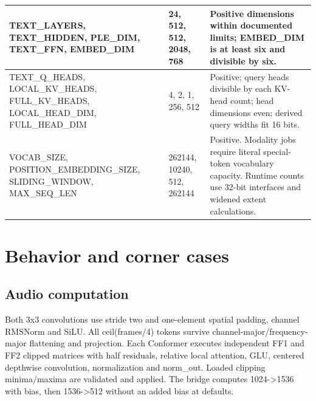 \documentclass[11pt,a4paper]{article}
\begin{document}
{\begin{longtable}{@{}L{0.22\textwidth}|L{0.21\textwidth}|L{0.49\textwidth}@{}}
TEXT\_\allowbreak{}LAYERS,\allowbreak{} TEXT\_\allowbreak{}HIDDEN,\allowbreak{} PLE\_\allowbreak{}DIM,\allowbreak{} TEXT\_\allowbreak{}FFN,\allowbreak{} EMBED\_\allowbreak{}DIM & 24,\allowbreak{} 512,\allowbreak{} 512,\allowbreak{} 2048,\allowbreak{} 768 & Positive dimensions within documented limits; EMBED\_\allowbreak{}DIM is at least six and divisible by six.\\[2pt]\hline

TEXT\_\allowbreak{}Q\_\allowbreak{}HEADS,\allowbreak{} LOCAL\_\allowbreak{}KV\_\allowbreak{}HEADS,\allowbreak{} FULL\_\allowbreak{}KV\_\allowbreak{}HEADS,\allowbreak{} LOCAL\_\allowbreak{}HEAD\_\allowbreak{}DIM,\allowbreak{} FULL\_\allowbreak{}HEAD\_\allowbreak{}DIM & 4,\allowbreak{} 2,\allowbreak{} 1,\allowbreak{} 256,\allowbreak{} 512 & Positive; query heads divisible by each KV-head count; head dimensions even; derived query widths fit 16 bits.\\[2pt]\hline

VOCAB\_\allowbreak{}SIZE,\allowbreak{} POSITION\_\allowbreak{}EMBEDDING\_\allowbreak{}SIZE,\allowbreak{} SLIDING\_\allowbreak{}WINDOW,\allowbreak{} MAX\_\allowbreak{}SEQ\_\allowbreak{}LEN & 262144,\allowbreak{} 10240,\allowbreak{} 512,\allowbreak{} 262144 & Positive. Modality jobs require literal special-token vocabulary capacity. Runtime counts use 32-bit interfaces and widened extent calculations.\\[2pt]\hline

\bottomrule\end{longtable}}

\section{Behavior and corner cases}

\subsection{Audio computation}

Both 3x3 convolutions use stride two and one-element spatial padding,\allowbreak{} channel RMSNorm and SiLU. All ceil(\allowbreak{}frames/\allowbreak{}4)\allowbreak{} tokens survive channel-major/\allowbreak{}frequency-major flattening and projection. Each Conformer executes independent FF1 and FF2 clipped matrices with half residuals,\allowbreak{} relative local attention,\allowbreak{} GLU,\allowbreak{} centered depthwise convolution,\allowbreak{} normalization and norm\_\allowbreak{}out. Loaded clipping minima/\allowbreak{}maxima are validated and applied. The bridge computes 1024->1536 with bias,\allowbreak{} then 1536->512 without an added bias at defaults.
\end{document}
